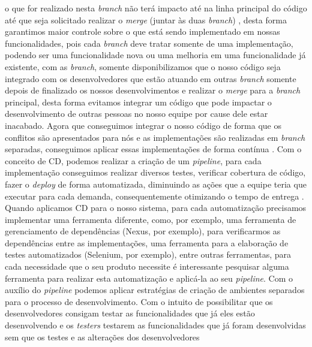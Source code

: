       o que for realizado nesta \textit{branch} não terá impacto até na linha
      principal do código até que seja solicitado realizar o \textit{merge}
      (juntar às duas \textit{branch}) \cite{ProGit}, desta forma garantimos maior
      controle sobre o que está sendo implementado em nossas funcionalidades, pois
      cada \textit{branch} deve tratar somente de uma implementação, podendo ser
      uma funcionalidade nova ou uma melhoria em uma funcionalidade já existente,
      com as \textit{branch}, somente disponibilizamos que o nosso código seja
      integrado com os desenvolvedores que estão atuando em outras \textit{branch}
      somente depois de finalizado os nossos desenvolvimentos e realizar o \textit{merge}
      para a \textit{branch} principal, desta forma evitamos integrar um código
      que pode impactar o desenvolvimento de outras pessoas no nosso equipe por
      cause dele estar inacabado. \newline
      Agora que conseguimos integrar o nosso código de forma que os conflitos são
      apresentados para nós e as implementações são realizadas em \textit{branch}
      separadas, conseguimos aplicar essas implementações de forma contínua
      \cite{TheDevOpsHandbook}. Com o conceito de CD, podemos realizar a criação
      de um \textit{pipeline}, para cada implementação conseguimos realizar
      diversos testes, verificar cobertura de código, fazer o \textit{deploy}
      de forma automatizada, diminuindo as ações que a equipe teria que executar
      para cada demanda, consequentemente otimizando o tempo de entrega
      \cite{ContinuousDelivery}. Quando aplicamos CD para o nosso sistema,
      para cada automatização precisamos implementar uma ferramenta diferente,
      como, por exemplo, uma ferramenta de gerenciamento de dependências
      (Nexus, por exemplo), para verificarmos as dependências entre as implementações,
      uma ferramenta para a elaboração de testes automatizados (Selenium, por exemplo),
      entre outras ferramentas, para cada necessidade que o seu produto necessite
      é interessante pesquisar alguma ferramenta para realizar esta automatização
      e aplicá-la ao seu \textit{pipeline}. \newline
      Com o auxílio do \textit{pipeline} podemos aplicar estratégias de criação
      de ambientes separados para o processo de desenvolvimento. Com o intuito de
      possibilitar que os desenvolvedores consigam testar as funcionalidades que
      já eles estão desenvolvendo e os \textit{testers} testarem as funcionalidades
      que já foram desenvolvidas sem que os testes e as alterações dos desenvolvedores
